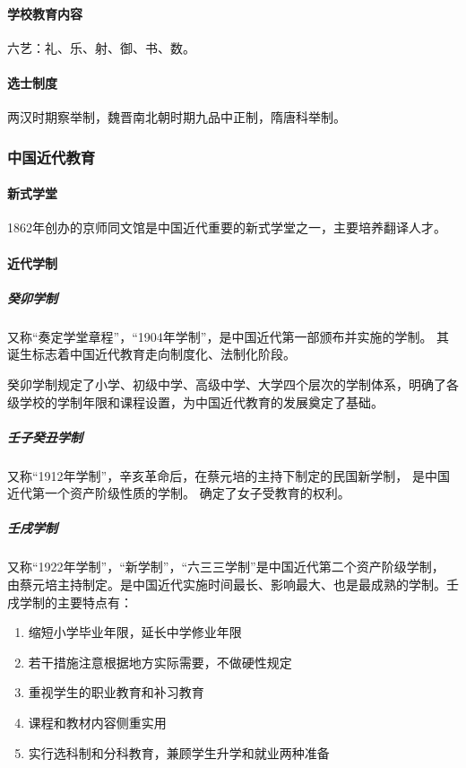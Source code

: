 \documentclass[b5paper,11pt]{article}
\begin{document}
\paragraph{学校教育内容} 六艺：礼、乐、射、御、书、数。
\paragraph{选士制度} 两汉时期察举制，魏晋南北朝时期九品中正制，隋唐科举制。

\subsubsection{中国近代教育}
\paragraph{新式学堂} 1862年创办的\textcolor{ctp-red}{京师同文馆}是中国近代重要的新式学堂之一，主要培养翻译人才。
\paragraph{近代学制}
\subparagraph{癸卯学制}又称“奏定学堂章程”，“1904年学制”，是\textcolor{ctp-red}{中国近代第一部颁布并实施的学制}。
其诞生标志着中国近代教育走向\textcolor{ctp-red}{制度化、法制化}阶段。
\begin{cquote}
  癸卯学制规定了小学、初级中学、高级中学、大学四个层次的学制体系，明确了各级学校的学制年限和课程设置，为中国近代教育的发展奠定了基础。
\end{cquote}

\subparagraph{壬子癸丑学制}又称“1912年学制”，辛亥革命后，在\textcolor{ctp-red}{蔡元培}的主持下制定的\textcolor{ctp-red}{民国新学制}，
是中国近代第一个\textcolor{ctp-red}{资产阶级}性质的学制。 确定了女子受教育的权利。

\subparagraph{壬戌学制}又称“1922年学制”，“新学制”，“六三三学制”是\textcolor{ctp-red}{中国近代第二个资产阶级学制}，
由\textcolor{ctp-red}{蔡元培}主持制定。是中国近代实施时间最长、影响最大、也是最成熟的学制。壬戌学制的主要特点有：
\begin{enumerate}
  \item 缩短小学毕业年限，延长中学修业年限
  \item 若干措施注意根据地方实际需要，不做硬性规定
  \item 重视学生的职业教育和补习教育
  \item 课程和教材内容侧重实用
  \item 实行选科制和分科教育，兼顾学生升学和就业两种准备
\end{enumerate}
\end{document}
